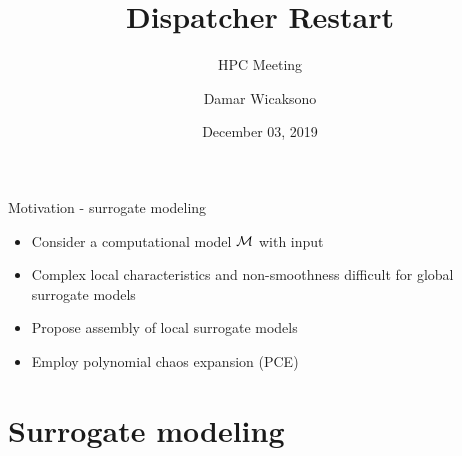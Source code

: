 \documentclass{rsuqbeamernew}
\title[HPC Meeting]{Dispatcher Restart}
\subtitle{HPC Meeting}
\institute[Chair of Risk \& Safety] {}
\author[D. Wicaksono]{Damar Wicaksono}
\date[December 03, 2019] {\small December 03, 2019}
\begin{document}
\begin{frame}[t]{Motivation - surrogate modeling}
	\small
	\\
	\begin{itemize}
		\item [] Consider a {\altx computational model} ${\mathcal M}$ with input 
	\end{itemize}
	\begin{minipage}[t][3cm][t]{\textwidth}
	\end{minipage}	

	\pause
	\begin{itemize}
		\item {\altx Complex local 
		characteristics} and {\altx non-smoothness} difficult for {\altx 
		global} surrogate models
		\item Propose assembly of {\altx local} surrogate models
		\item Employ {\altx polynomial chaos expansion} (PCE) 
	\end{itemize}
	
\end{frame}


\section{Surrogate modeling}
\secoutline


\end{document}
